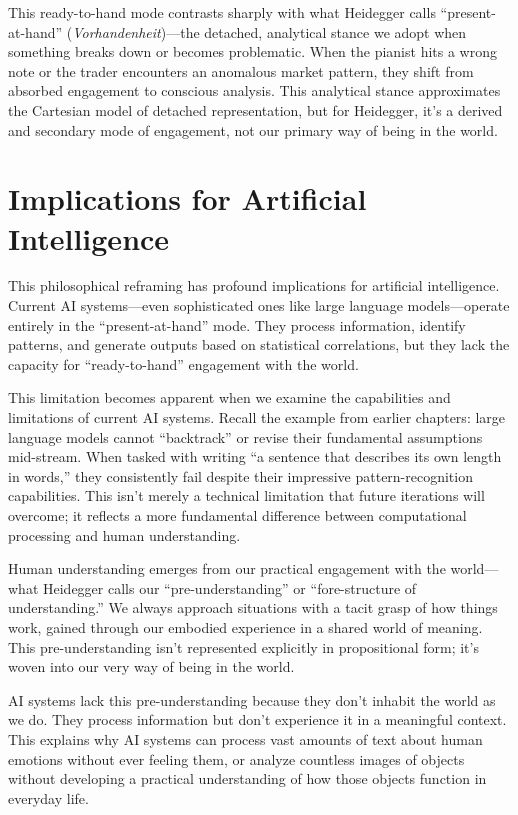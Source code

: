 \documentclass[
  Letterpaper,
]{scrbook}
\begin{document}
This ready-to-hand mode contrasts sharply with what Heidegger calls
``present-at-hand'' (\emph{Vorhandenheit})---the detached, analytical
stance we adopt when something breaks down or becomes problematic. When
the pianist hits a wrong note or the trader encounters an anomalous
market pattern, they shift from absorbed engagement to conscious
analysis. This analytical stance approximates the Cartesian model of
detached representation, but for Heidegger, it's a derived and secondary
mode of engagement, not our primary way of being in the world.

\section{Implications for Artificial
Intelligence}\label{implications-for-artificial-intelligence}

This philosophical reframing has profound implications for artificial
intelligence. Current AI systems---even sophisticated ones like large
language models---operate entirely in the ``present-at-hand'' mode. They
process information, identify patterns, and generate outputs based on
statistical correlations, but they lack the capacity for
``ready-to-hand'' engagement with the world.

This limitation becomes apparent when we examine the capabilities and
limitations of current AI systems. Recall the example from earlier
chapters: large language models cannot ``backtrack'' or revise their
fundamental assumptions mid-stream. When tasked with writing ``a
sentence that describes its own length in words,'' they consistently
fail despite their impressive pattern-recognition capabilities. This
isn't merely a technical limitation that future iterations will
overcome; it reflects a more fundamental difference between
computational processing and human understanding.

Human understanding emerges from our practical engagement with the
world---what Heidegger calls our ``pre-understanding'' or
``fore-structure of understanding.'' We always approach situations with
a tacit grasp of how things work, gained through our embodied experience
in a shared world of meaning. This pre-understanding isn't represented
explicitly in propositional form; it's woven into our very way of being
in the world.

AI systems lack this pre-understanding because they don't inhabit the
world as we do. They process information but don't experience it in a
meaningful context. This explains why AI systems can process vast
amounts of text about human emotions without ever feeling them, or
analyze countless images of objects without developing a practical
understanding of how those objects function in everyday life.
\end{document}
